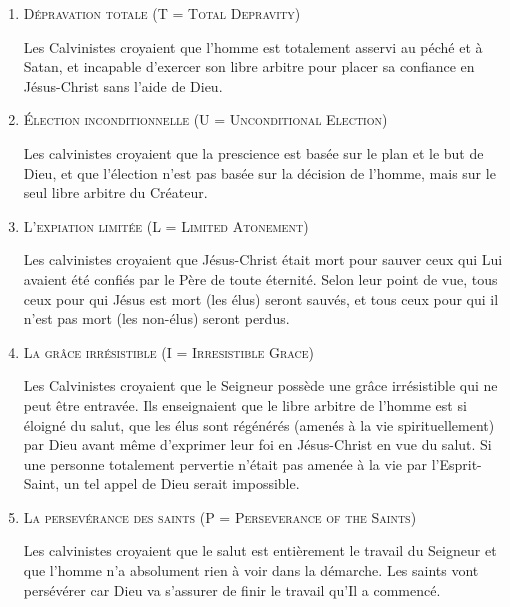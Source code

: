 \begin{enumerate}

  \item  \textsc{Dépravation totale (\og T \fg{} = Total Depravity)}

Les Calvinistes croyaient que l'homme est totalement 
 asservi au péché  et à Satan,
 et incapable d'exercer son libre arbitre 
 pour placer sa confiance en Jésus-Christ sans l'aide de Dieu.

  \item  \textsc{Élection inconditionnelle (\og U \fg{} = Unconditional Election)}

Les calvinistes croyaient que la prescience 
 est basée sur le plan et le but de Dieu, et que l'élection
 n'est pas basée sur la décision de l'homme, mais sur le seul \og libre arbitre \fg{}
 du Créateur.

  \item  \textsc{L'expiation limitée (\og L \fg{} = Limited Atonement)}

Les calvinistes croyaient que Jésus-Christ était mort pour sauver
 ceux qui Lui avaient été confiés par le Père de toute éternité.
 Selon leur point de vue, tous ceux pour qui Jésus est mort (les élus) seront sauvés,
 et tous ceux pour qui il n'est pas mort (les non-élus) seront perdus.

  \item  \textsc{La grâce irrésistible (\og I \fg{} = Irresistible Grace)}

Les Calvinistes croyaient que le Seigneur possède une grâce irrésistible
 qui ne peut être entravée. Ils enseignaient que le libre arbitre de l'homme
 est si éloigné du salut, que les élus sont régénérés (amenés à la vie spirituellement)
 par Dieu avant même d'exprimer leur foi en Jésus-Christ en vue du salut.
 Si une personne totalement pervertie n'était pas amenée à la vie par l'Esprit-Saint,
 un tel appel de Dieu serait impossible.

  \item  \textsc{La persevérance des saints (\og P \fg{} = Perseverance of the Saints)}

Les calvinistes croyaient que le salut est entièrement le travail du Seigneur
 et que l'homme n'a absolument rien à voir dans la démarche.
 Les saints vont persévérer car Dieu va s'assurer de finir le travail
 qu'Il a commencé.

\end{enumerate}

